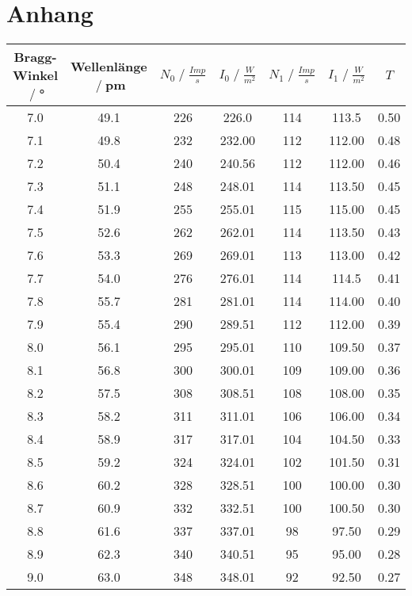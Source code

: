 \section{Anhang}
\begin{table}
    \centering
    \begin{tabular}{c | c | c | c | c | c | c}
    Bragg-Winkel $\;/\;$°& Wellenlänge $\;/\;$pm & $N_0 \;/\;\frac{\si{Imp}}{s}$ & $I_0 \;/\;\frac{W}{m^2}$ &
    $N_1\;/\;\frac{Imp}{s}$ & $I_1\;/\;\frac{W}{m^2}$ & $T$\\
    \midrule
        7.0 & 49.1 & 226 & 226.0& 114 & 113.5 & 0.50\\
        7.1 & 49.8 & 232 & 232.00 & 112 & 112.00 & 0.48\\
        7.2 & 50.4 & 240 & 240.56 & 112 & 112.00 & 0.46\\
        7.3 & 51.1 & 248 & 248.01 & 114 & 113.50 & 0.45\\
        7.4 & 51.9 & 255 & 255.01 & 115 & 115.00 & 0.45\\
        7.5 & 52.6 & 262 & 262.01 & 114 & 113.50 & 0.43\\
        7.6 & 53.3 & 269 & 269.01 & 113 & 113.00 & 0.42\\
        7.7 & 54.0 & 276 & 276.01 & 114 & 114.5 & 0.41\\
        7.8 & 55.7 & 281 & 281.01 & 114 & 114.00 & 0.40\\
        7.9 & 55.4 & 290 & 289.51 & 112 & 112.00 & 0.39\\
        8.0 & 56.1 & 295 & 295.01 & 110 & 109.50 & 0.37\\
        8.1 & 56.8 & 300 & 300.01 & 109 & 109.00 & 0.36\\
        8.2 & 57.5 & 308 & 308.51 & 108 & 108.00 & 0.35\\
        8.3 & 58.2 & 311 & 311.01 & 106 & 106.00 & 0.34\\
        8.4 & 58.9 & 317 & 317.01 & 104 & 104.50 & 0.33\\
        8.5 & 59.2 & 324 & 324.01 & 102 & 101.50 & 0.31\\
        8.6 & 60.2 & 328 & 328.51 & 100 & 100.00 & 0.30\\
        8.7 & 60.9 & 332 & 332.51 & 100 & 100.50 & 0.30\\
        8.8 & 61.6 & 337 & 337.01 & 98 & 97.50 & 0.29\\
        8.9 & 62.3 & 340 & 340.51 & 95 & 95.00 & 0.28\\
        9.0 & 63.0 & 348 & 348.01 & 92 & 92.50 & 0.27\\

\end{tabular}
\end{table}
